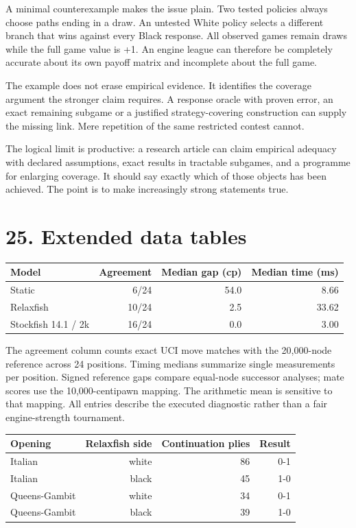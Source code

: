 \documentclass[10pt]{article}
\begin{document}
A minimal counterexample makes the issue plain. Two tested policies always choose paths ending in a draw. An untested White policy selects a different branch that wins against every Black response. All observed games remain draws while the full game value is +1. An engine league can therefore be completely accurate about its own payoff matrix and incomplete about the full game.

The example does not erase empirical evidence. It identifies the coverage argument the stronger claim requires. A response oracle with proven error, an exact remaining subgame or a justified strategy-covering construction can supply the missing link. Mere repetition of the same restricted contest cannot.

The logical limit is productive: a research article can claim empirical adequacy with declared assumptions, exact results in tractable subgames, and a programme for enlarging coverage. It should say exactly which of those objects has been achieved. The point is to make increasingly strong statements true.

\clearpage
\section*{25. Extended data tables}
\begin{center}\small
\begin{tabular}{lrrr}\toprule
Model & Agreement & Median gap (cp) & Median time (ms)\\\midrule
Static & 6/24 & 54.0 & 8.66\\
Relaxfish & 10/24 & 2.5 & 33.62\\
Stockfish 14.1 / 2k & 16/24 & 0.0 & 3.00\\
\bottomrule\end{tabular}\end{center}


The agreement column counts exact UCI move matches with the 20,000-node reference across 24 positions. Timing medians summarize single measurements per position. Signed reference gaps compare equal-node successor analyses; mate scores use the 10,000-centipawn mapping. The arithmetic mean is sensitive to that mapping. All entries describe the executed diagnostic rather than a fair engine-strength tournament.

\begin{center}\small
\begin{tabular}{lrrr}\toprule
Opening & Relaxfish side & Continuation plies & Result\\\midrule
Italian & white & 86 & 0-1\\
Italian & black & 45 & 1-0\\
Queens-Gambit & white & 34 & 0-1\\
Queens-Gambit & black & 39 & 1-0\\
\bottomrule\end{tabular}\end{center}
\end{document}
